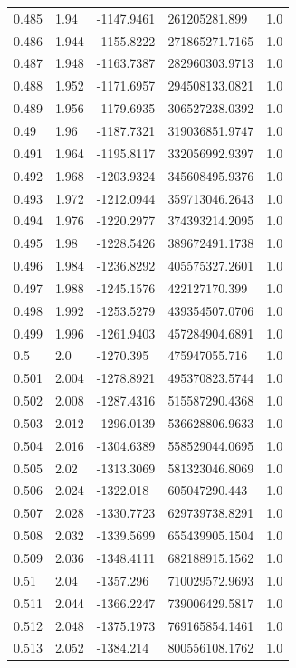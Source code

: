 \begin{tabular}{lllll}
0.485 & 1.94 & -1147.9461 & 261205281.899 & 1.0 \\
0.486 & 1.944 & -1155.8222 & 271865271.7165 & 1.0 \\
0.487 & 1.948 & -1163.7387 & 282960303.9713 & 1.0 \\
0.488 & 1.952 & -1171.6957 & 294508133.0821 & 1.0 \\
0.489 & 1.956 & -1179.6935 & 306527238.0392 & 1.0 \\
0.49 & 1.96 & -1187.7321 & 319036851.9747 & 1.0 \\
0.491 & 1.964 & -1195.8117 & 332056992.9397 & 1.0 \\
0.492 & 1.968 & -1203.9324 & 345608495.9376 & 1.0 \\
0.493 & 1.972 & -1212.0944 & 359713046.2643 & 1.0 \\
0.494 & 1.976 & -1220.2977 & 374393214.2095 & 1.0 \\
0.495 & 1.98 & -1228.5426 & 389672491.1738 & 1.0 \\
0.496 & 1.984 & -1236.8292 & 405575327.2601 & 1.0 \\
0.497 & 1.988 & -1245.1576 & 422127170.399 & 1.0 \\
0.498 & 1.992 & -1253.5279 & 439354507.0706 & 1.0 \\
0.499 & 1.996 & -1261.9403 & 457284904.6891 & 1.0 \\
0.5 & 2.0 & -1270.395 & 475947055.716 & 1.0 \\
0.501 & 2.004 & -1278.8921 & 495370823.5744 & 1.0 \\
0.502 & 2.008 & -1287.4316 & 515587290.4368 & 1.0 \\
0.503 & 2.012 & -1296.0139 & 536628806.9633 & 1.0 \\
0.504 & 2.016 & -1304.6389 & 558529044.0695 & 1.0 \\
0.505 & 2.02 & -1313.3069 & 581323046.8069 & 1.0 \\
0.506 & 2.024 & -1322.018 & 605047290.443 & 1.0 \\
0.507 & 2.028 & -1330.7723 & 629739738.8291 & 1.0 \\
0.508 & 2.032 & -1339.5699 & 655439905.1504 & 1.0 \\
0.509 & 2.036 & -1348.4111 & 682188915.1562 & 1.0 \\
0.51 & 2.04 & -1357.296 & 710029572.9693 & 1.0 \\
0.511 & 2.044 & -1366.2247 & 739006429.5817 & 1.0 \\
0.512 & 2.048 & -1375.1973 & 769165854.1461 & 1.0 \\
0.513 & 2.052 & -1384.214 & 800556108.1762 & 1.0 \\

\end{tabular}
